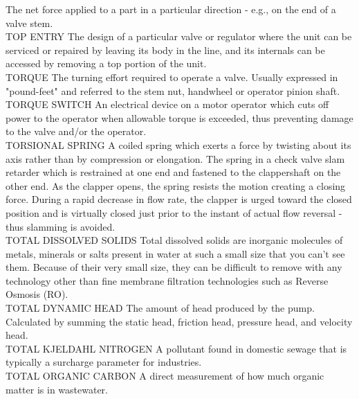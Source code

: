 \documentclass{article}
\begin{document}
The net force applied to a part in a particular direction - e.g., on the end of a valve stem.
\vspace{0.3cm}\\
TOP ENTRY
The design of a particular valve or regulator where the unit can be serviced or repaired by leaving its body in the line, and its internals can be accessed by removing a top portion of the unit.
\vspace{0.3cm}\\
TORQUE
The turning effort required to operate a valve. Usually expressed in "pound-feet" and referred to the stem nut, handwheel or operator pinion shaft.
\vspace{0.3cm}\\
TORQUE SWITCH
An electrical device on a motor operator which cuts off power to the operator when allowable torque is exceeded, thus preventing damage to the valve and/or the operator.
\vspace{0.3cm}\\
TORSIONAL SPRING
A coiled spring which exerts a force by twisting about its axis rather than by compression or elongation. The spring in a check valve slam retarder which is restrained at one end and fastened to the clappershaft on the other end. As the clapper opens, the spring resists the motion creating a closing force. During a rapid decrease in flow rate, the clapper is urged toward the closed position and is virtually closed just prior to the instant of actual flow reversal - thus slamming is avoided.
\vspace{0.3cm}\\
TOTAL DISSOLVED SOLIDS
Total dissolved solids are inorganic molecules of metals, minerals or salts present in water at such a small size that you can’t see them. Because of their very small size, they can be difficult to remove with any technology other than fine membrane filtration technologies such as Reverse Osmosis (RO).
\vspace{0.3cm}\\
TOTAL DYNAMIC HEAD
The amount of head produced by the pump. Calculated by summing the static head, friction head, pressure head, and velocity head.
\vspace{0.3cm}\\
TOTAL KJELDAHL NITROGEN
A pollutant found in domestic sewage that is typically a surcharge parameter for industries.
\vspace{0.3cm}\\
TOTAL ORGANIC CARBON
A direct measurement of how much organic matter is in wastewater.
\end{document}
